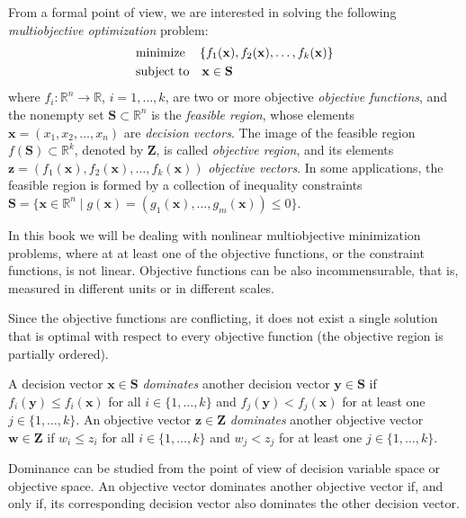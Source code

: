 {From a formal point of view, we are interested in solving the following \emph{multiobjective optimization} problem:
\begin{align*}
     & \text{minimize}	  \quad \left\{f_1(\mathbf{x}), f_2(\mathbf{x}), \ldots, f_k(\mathbf{x}) \right\} \\
     & \text{subject\;to} \quad \mathbf{x} \in \mathbf{S}
\end{align*}
where $f_i:\mathbb{R}^n \rightarrow \mathbb{R}$, $i = 1, \ldots, k$, are two or more objective \emph{objective functions}, and the nonempty set $\mathbf{S} \subset \mathbb{R}^n$ is the \emph{feasible region}, whose elements $\mathbf{x} = \left( x_1, x_2, \ldots, x_n \right)$ are \emph{decision vectors}. The image of the feasible region $f(\mathbf{S}) \subset \mathbb{R}^k$, denoted by $\mathbf{Z}$, is called \emph{objective region}, and its elements $\mathbf{z} = \left(f_1(\mathbf{x}), f_2(\mathbf{x}), \ldots, f_k(\mathbf{x}) \right)$ \emph{objective vectors}. In some applications, the feasible region is formed by a collection of inequality constraints $\mathbf{S} = \{ \mathbf{x} \in \mathbb{R}^n \mid g(\mathbf{x}) = \left( g_1(\mathbf{x}), \ldots, g_m(\mathbf{x}) \right) \leq 0 \}$.

In this book we will be dealing with nonlinear multiobjective minimization problems, where at at least one of the objective functions, or the constraint functions, is not linear. Objective functions can be also incommensurable, that is, measured in different units or in different scales.

Since the objective functions are conflicting, it does not exist a single solution that is optimal with respect to every objective function (the objective region is partially ordered). 

\begin{definition}
A decision vector $\mathbf{x} \in \mathbf{S}$ \emph{dominates} another decision vector $\mathbf{y} \in \mathbf{S}$ if $f_i(\mathbf{y}) \leq f_i(\mathbf{x})$ for all $i \in \{1, \ldots, k\}$ and $f_j(\mathbf{y}) < f_j(\mathbf{x})$ for at least one $j \in \{1, \ldots, k\}$. An objective vector $\mathbf{z} \in \mathbf{Z}$ \emph{dominates} another objective vector $\mathbf{w} \in \mathbf{Z}$ if $w_i \leq z_i$ for all $i \in \{1, \ldots, k\}$ and $w_j < z_j$ for at least one $j \in \{1, \ldots, k\}$.
\end{definition}

Dominance can be studied from the point of view of decision variable space or objective space. An objective vector dominates another objective vector if, and only if, its corresponding decision vector also dominates the other decision vector.

}
